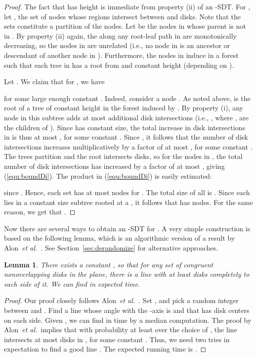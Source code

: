 \documentclass{paper}
\newcommand {\etal} {\textit {et al.}}
\newtheorem{lemma}[theorem]{Lemma}
\begin{document}
\begin{proof}
The fact that  has height  is immediate from property
(ii) of an -SDT.
For , let 
, the set of nodes
whose regions intersect between  and  disks.
Note that the sets  constitute a partition of the nodes.
Let  be the nodes in  whose parent
is not in . By property (ii) again, the  
along any root-leaf path in  are monotonically decreasing, so the nodes in 
 are unrelated (i.e., no node in  is 
an ancestor or descendant of another node in 
). 
Furthermore, the nodes in  induce in  a forest  such 
that each tree in  has a root from  and 
constant height (depending on ).

Let .
We claim that for , we have  

for some large enough constant .
Indeed, consider a node .
As noted above,  is the root of a tree  of constant height in the 
forest induced by .
By property (i), any node   in this subtree adds at most 
 additional disk intersections (i.e., 
, where ,  are the children of
).
Since 
 has
constant size, the total increase in disk intersections in 
is thus at most , for some constant . 
Since , it follows that the number of disk intersections
increases multiplicatively by a factor of at most , for some constant .
The trees  partition  and the root intersects
 disks, so for the nodes in , the total number of 
disk intersections
has increased by a factor of at most 
, giving 
(\ref{equ:boundDi}). The product in (\ref{equ:boundDi}) is easily estimated:

since . Hence, each set  has at most
 nodes for . The total size of all 
 is .
Since each   lies in a constant size subtree rooted at 
a , it follows that  has  nodes.
For the same reason, we get that
.
\end{proof}

Now there are several ways to obtain an -SDT 
for .
A very simple construction is based on the following lemma, which 
is an algorithmic version of a result by 
Alon~\etal~\cite[Theorem~1.2]{akp-cddsl-89}. 
See Section~\ref{sec:derandomize} for alternative approaches.

\begin{lemma}\label{lem:line-separator}
There exists a constant , so that for any set  of 
 congruent nonoverlapping disks in the plane, there is a 
line  with at least  disks completely 
to each side of it. We can find  in 
 expected time.
\end{lemma}


\begin{proof}
Our proof closely follows Alon~\etal~\cite[Section~2]{akp-cddsl-89}.
Set ,
and pick a random integer  between  and . 
Find a line  whose angle with the -axis is 
and that has  disk centers on each side.
Given , we can find  in  time by a median computation.
The proof by Alon~\etal\ implies that with probability at least  over the
choice of , the line  intersects at most  disks in
, for some constant .
Thus,  
we need two tries in expectation
to find a good line . The 
expected running time is . 
\end{proof}
\end{document}
